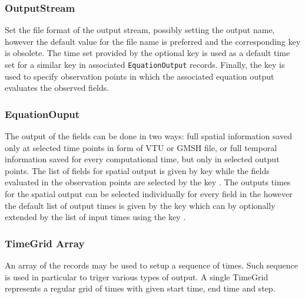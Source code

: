 \subsubsection{OutputStream}
Set the file format of the output stream, possibly setting the output name, however the default value for the file name is preferred and the corresponding key 
 is obsolete.
The time set provided by the optional key  is used as a default time set for a similar key in associated 
\verb'EquationOutput' records. Finally, the key  is used to specify observation points
in which the associated equation output evaluates the observed fields.

\subsubsection{EquationOuput}
The output of the fields can be done in two ways: full spatial information saved only at selected time points in form of 
VTU or GMSH file, or full temporal information saved for every computational time, but only in selected output points.
The list of fields for spatial output is given by key  while the fields 
evaluated in the observation points are selected by the key .
The outputs times for the spatial output can be selected individually for every field in the 
 however the default list of output times is given by the key
 which can by optionally extended by the list of input times
using the key .

\subsubsection{TimeGrid Array}
\hypertarget{sec:TimeGrid}{}

An array of the  records may be used to setup a sequence of times. Such sequence is used in particular 
to triger various types of output. A single TimeGrid represents a regular grid of times with given start time, end time and step.
